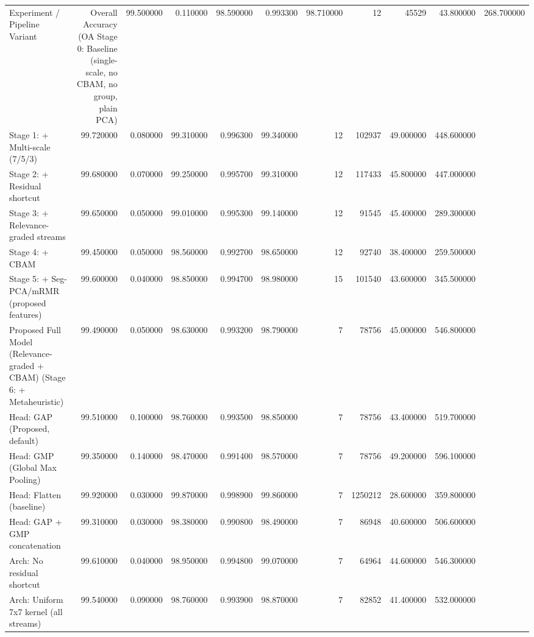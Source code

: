 \begin{tabular}{lrrrrrrrrr}
\toprule
Experiment / Pipeline Variant & Overall Accuracy (OA %
\midrule
Stage 0: Baseline (single-scale, no CBAM, no group, plain PCA) & 99.500000 & 0.110000 & 98.590000 & 0.993300 & 98.710000 & 12 & 45529 & 43.800000 & 268.700000 \\
Stage 1: + Multi-scale (7/5/3) & 99.720000 & 0.080000 & 99.310000 & 0.996300 & 99.340000 & 12 & 102937 & 49.000000 & 448.600000 \\
Stage 2: + Residual shortcut & 99.680000 & 0.070000 & 99.250000 & 0.995700 & 99.310000 & 12 & 117433 & 45.800000 & 447.000000 \\
Stage 3: + Relevance-graded streams & 99.650000 & 0.050000 & 99.010000 & 0.995300 & 99.140000 & 12 & 91545 & 45.400000 & 289.300000 \\
Stage 4: + CBAM & 99.450000 & 0.050000 & 98.560000 & 0.992700 & 98.650000 & 12 & 92740 & 38.400000 & 259.500000 \\
Stage 5: + Seg-PCA/mRMR (proposed features) & 99.600000 & 0.040000 & 98.850000 & 0.994700 & 98.980000 & 15 & 101540 & 43.600000 & 345.500000 \\
Proposed Full Model (Relevance-graded + CBAM) (Stage 6: + Metaheuristic) & 99.490000 & 0.050000 & 98.630000 & 0.993200 & 98.790000 & 7 & 78756 & 45.000000 & 546.800000 \\
Head: GAP (Proposed, default) & 99.510000 & 0.100000 & 98.760000 & 0.993500 & 98.850000 & 7 & 78756 & 43.400000 & 519.700000 \\
Head: GMP (Global Max Pooling) & 99.350000 & 0.140000 & 98.470000 & 0.991400 & 98.570000 & 7 & 78756 & 49.200000 & 596.100000 \\
Head: Flatten (baseline) & 99.920000 & 0.030000 & 99.870000 & 0.998900 & 99.860000 & 7 & 1250212 & 28.600000 & 359.800000 \\
Head: GAP + GMP concatenation & 99.310000 & 0.030000 & 98.380000 & 0.990800 & 98.490000 & 7 & 86948 & 40.600000 & 506.600000 \\
Arch: No residual shortcut & 99.610000 & 0.040000 & 98.950000 & 0.994800 & 99.070000 & 7 & 64964 & 44.600000 & 546.300000 \\
Arch: Uniform 7x7 kernel (all streams) & 99.540000 & 0.090000 & 98.760000 & 0.993900 & 98.870000 & 7 & 82852 & 41.400000 & 532.000000 \\

\end{tabular}
